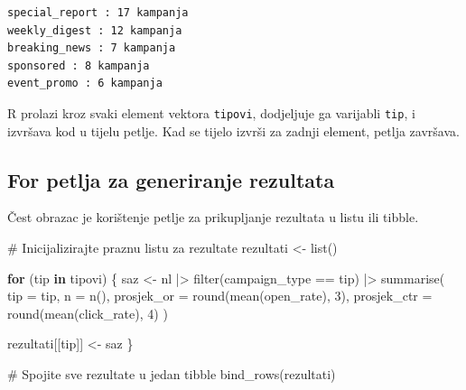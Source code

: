 \documentclass[
  croatian,
  letterpaper,
  DIV=11,
  numbers=noendperiod]{scrartcl}
\newenvironment{Shaded}{\begin{snugshade}}{\end{snugshade}}
\newcommand{\AttributeTok}[1]{\textcolor[rgb]{0.40,0.45,0.13}{#1}}
\newcommand{\CommentTok}[1]{\textcolor[rgb]{0.37,0.37,0.37}{#1}}
\newcommand{\ControlFlowTok}[1]{\textcolor[rgb]{0.00,0.23,0.31}{\textbf{#1}}}
\newcommand{\DecValTok}[1]{\textcolor[rgb]{0.68,0.00,0.00}{#1}}
\newcommand{\FunctionTok}[1]{\textcolor[rgb]{0.28,0.35,0.67}{#1}}
\newcommand{\NormalTok}[1]{\textcolor[rgb]{0.00,0.23,0.31}{#1}}
\newcommand{\OtherTok}[1]{\textcolor[rgb]{0.00,0.23,0.31}{#1}}
\newcommand{\SpecialCharTok}[1]{\textcolor[rgb]{0.37,0.37,0.37}{#1}}
\newcommand{\StringTok}[1]{\textcolor[rgb]{0.13,0.47,0.30}{#1}}
\begin{document}
\begin{Shaded}
\end{Shaded}

\begin{verbatim}
special_report : 17 kampanja
weekly_digest : 12 kampanja
breaking_news : 7 kampanja
sponsored : 8 kampanja
event_promo : 6 kampanja
\end{verbatim}

R prolazi kroz svaki element vektora \texttt{tipovi}, dodjeljuje ga
varijabli \texttt{tip}, i izvršava kod u tijelu petlje. Kad se tijelo
izvrši za zadnji element, petlja završava.

\subsection{For petlja za generiranje
rezultata}\label{for-petlja-za-generiranje-rezultata}

Čest obrazac je korištenje petlje za prikupljanje rezultata u listu ili
tibble.

\begin{Shaded}
\begin{Highlighting}[]
\CommentTok{\# Inicijalizirajte praznu listu za rezultate}
\NormalTok{rezultati }\OtherTok{\textless{}{-}} \FunctionTok{list}\NormalTok{()}

\ControlFlowTok{for}\NormalTok{ (tip }\ControlFlowTok{in}\NormalTok{ tipovi) \{}
\NormalTok{  saz }\OtherTok{\textless{}{-}}\NormalTok{ nl }\SpecialCharTok{|\textgreater{}}
    \FunctionTok{filter}\NormalTok{(campaign\_type }\SpecialCharTok{==}\NormalTok{ tip) }\SpecialCharTok{|\textgreater{}}
    \FunctionTok{summarise}\NormalTok{(}
      \AttributeTok{tip =}\NormalTok{ tip,}
      \AttributeTok{n =} \FunctionTok{n}\NormalTok{(),}
      \AttributeTok{prosjek\_or =} \FunctionTok{round}\NormalTok{(}\FunctionTok{mean}\NormalTok{(open\_rate), }\DecValTok{3}\NormalTok{),}
      \AttributeTok{prosjek\_ctr =} \FunctionTok{round}\NormalTok{(}\FunctionTok{mean}\NormalTok{(click\_rate), }\DecValTok{4}\NormalTok{)}
\NormalTok{    )}
  
\NormalTok{  rezultati[[tip]] }\OtherTok{\textless{}{-}}\NormalTok{ saz}
\NormalTok{\}}

\CommentTok{\# Spojite sve rezultate u jedan tibble}
\FunctionTok{bind\_rows}\NormalTok{(rezultati)}
\end{Highlighting}
\end{Shaded}
\end{document}
